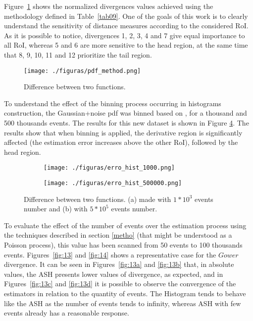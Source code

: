 \documentclass[conference]{IEEEtran}
\begin{document}
Figure~\ref{fig:07} shows the normalized divergences values achieved using the methodology defined in Table~\ref{tab09}. One of the goals of this work is to clearly understand the sensitivity of distance measures according to the considered RoI.
As it is possible to notice, divergences 1, 2, 3, 4 and 7 give equal importance to all RoI, whereas 5 and 6 are more sensitive to the head region, at the same time that 8, 9, 10, 11 and 12 prioritize the tail region.

\begin{figure}[!h]
	\centering
	\texttt{[image: ./figuras/pdf\_method.png]}
	\caption{Difference between two functions.}
	\label{fig:07}
\end{figure}

To understand the effect of the binning process occurring in histograms construction, the Gaussian+noise pdf was binned based on \cite{freedman1981histogram}, for a thousand and 500 thousands events. The results for this new dataset is shown in Figure \ref{fig:12}. The results show that when binning is applied, the derivative region is significantly affected (the estimation error increases above the other RoI), followed by the head region.


\begin{figure}[!h]
	\centering
	\begin{subfigure}{0.225\textwidth}
		\texttt{[image: ./figuras/erro\_hist\_1000.png]}
		\caption{}
		\label{fig:12a}
	\end{subfigure}
	\begin{subfigure}{0.225\textwidth}
		\texttt{[image: ./figuras/erro\_hist\_500000.png]}
		\caption{}
		\label{fig:12b}
	\end{subfigure}
		\caption{Difference between two functions. (a) made with $1*10^3$ events number and (b) with $5*10^5$ events number.}
		\label{fig:12}
\end{figure}


To evaluate the effect of the number of events over the estimation process using the techniques described in section \ref{metho} (that might be understood as a Poisson process), this value has been scanned from 50 events to 100 thousands events. Figures~\ref{fig:13} and \ref{fig:14} shows a representative case for the $ Gower $ divergence. It can be seen in Figures~\ref{fig:13a} and \ref{fig:13b} that, in absolute values, the ASH presents lower values of divergence, as expected, and in Figures~\ref{fig:13c} and \ref{fig:13d} it is possible to observe the convergence of the estimators in relation to the quantity of events. The Histogram tends to behave like the ASH as the number of events tends to infinity, whereas ASH with few events already has a reasonable response.
\end{document}
